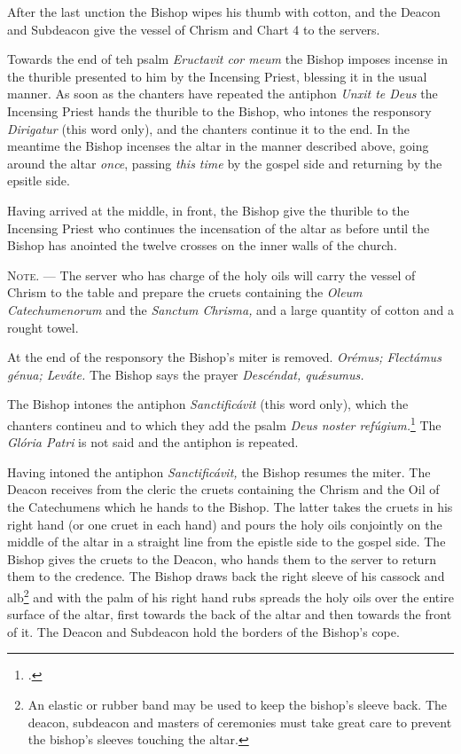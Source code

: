 \documentclass[letterpaper]{report}
\begin{document}
{After the last unction the Bishop wipes his thumb with cotton, and the Deacon
and Subdeacon give the vessel of Chrism and Chart 4 to the servers.

\rubric Towards the end of teh psalm \textit{Eructavit cor meum} the Bishop
imposes incense in the thurible presented to him by the Incensing Priest,
blessing it in the usual manner. As soon as the chanters have repeated the
antiphon \textit{Unxit te Deus} the Incensing Priest hands the thurible to the
Bishop, who intones the responsory \textit{Dirigatur} (this word only), and the
chanters continue it to the end. In the meantime the Bishop incenses the altar
in the manner described above, going around the altar \textit{once}, passing
\textit{this time} by the gospel side and returning by the epsitle side.

\rubric Having arrived at the middle, in front, the Bishop give the thurible to
the Incensing Priest who continues the incensation of the altar as before until
the Bishop has anointed the twelve crosses on the inner walls of the church.

\textsc{Note. ---} The server who has charge of the holy oils will carry the
vessel of Chrism to the table and prepare the cruets containing the
\textit{Oleum Catechumenorum} and the \textit{Sanctum Chrisma,} and a large
quantity of cotton and a rought towel.

\rubric At the end of the responsory the Bishop's miter is removed.
\textit{Orémus; Flectámus génua; Leváte.} The Bishop says the prayer
\textit{Descéndat, qu\'\ae sumus.}

\rubric The Bishop intones the antiphon \textit{Sanctificávit} (this word
only), which the chanters contineu and to which they add the psalm \textit{Deus
noster refúgium.}\footcite[The antiphon \textit{Sanctificávit Dóminus} may be
repeated after each verse of this psalm.][footnote 1, p. 108.]{consecranda} The
\textit{Glória Patri} is not said and the antiphon is repeated.

\rubric Having intoned the antiphon \textit{Sanctificávit,} the Bishop resumes
the miter. The Deacon receives from the cleric the cruets containing the Chrism
and the Oil of the Catechumens which he hands to the Bishop. The latter takes
the cruets in his right hand (or one cruet in each hand) and pours the holy
oils conjointly on the middle of the altar in a straight line from the epistle
side to the gospel side. The Bishop gives the cruets to the Deacon, who hands
them to the server to return them to the credence. The Bishop draws back the
right sleeve of his cassock and alb\footnote{An elastic or rubber band may be
used to keep the bishop's sleeve back. The deacon, subdeacon and masters of
ceremonies must take great care to prevent the bishop's sleeves touching the
altar.} and with the palm of his right hand rubs spreads the holy oils over the
entire surface of the altar, first towards the back of the altar and then
towards the front of it. The Deacon and Subdeacon hold the borders of the
Bishop's cope.

}
\end{document}
